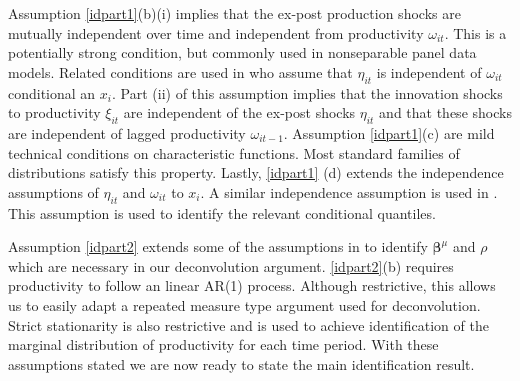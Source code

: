 \documentclass[11pt]{article}
\begin{document}
Assumption \ref{idpart1}(b)(i) implies that the ex-post production shocks are mutually independent over time and independent from productivity $\omega_{it}$. This is a potentially strong condition, but commonly used in nonseparable panel data models. Related conditions are used in \cite{Hu2019} who assume that $\eta_{it}$ is independent of $\omega_{it}$ conditional an $x_{i}$. Part (ii) of this assumption implies that the innovation shocks to productivity $\xi_{it}$ are independent of the ex-post shocks $\eta_{it}$ and that these shocks are independent of lagged productivity $\omega_{it-1}$. Assumption \ref{idpart1}(c) are mild technical conditions on characteristic functions. Most standard families of distributions satisfy this property. Lastly, \ref{idpart1} (d) extends the independence assumptions of $\eta_{it}$ and $\omega_{it}$ to $x_{i}$. A similar independence assumption is used in \cite{Gandhi2020}. This assumption is used to identify the relevant conditional quantiles.

Assumption \ref{idpart2} extends some of the assumptions in \cite{Ackerberg2015} to identify $\boldsymbol{\beta}^{\mu}$ and $\rho$ which are necessary in our deconvolution argument. \ref{idpart2}(b) requires productivity to follow an linear AR(1) process. Although restrictive, this allows us to easily adapt a repeated measure type argument used for deconvolution. Strict stationarity is also restrictive and is used to achieve identification of the marginal distribution of productivity for each time period. With these assumptions stated we are now ready to state the main identification result.
\end{document}
